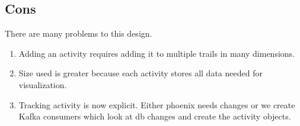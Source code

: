 \documentclass[11pt]{article}
\begin{document}
\subsection{Cons}

There are many problems to this design.

\begin{enumerate}
    \item Adding an activity requires adding it to multiple trails in many dimensions. 
    \item Size used is greater because each activity stores all data needed for visualization.
    \item Tracking activity is now explicit. Either phoenix needs changes or we create
           Kafka consumers which look at db changes and create the activity objects.
\end{enumerate}
\end{document}
